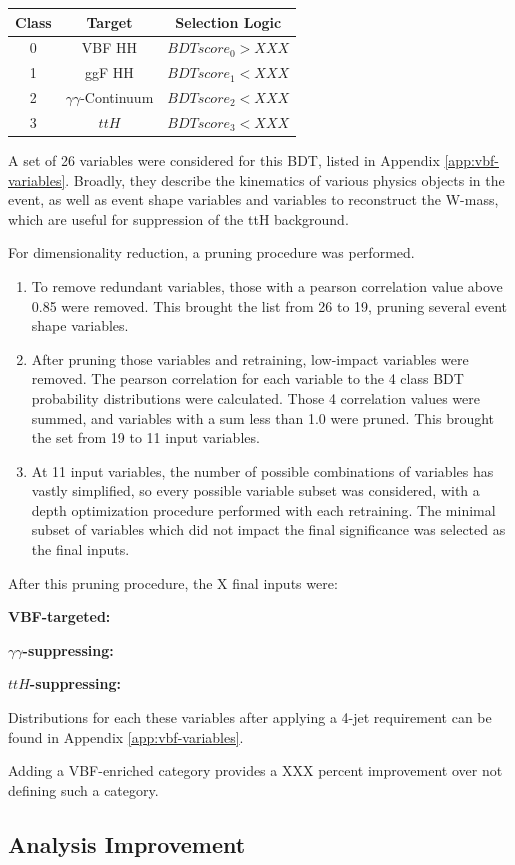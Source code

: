 \begin{center}
	\begin{tabular}{c|c|c}
	\hline
	Class & Target & Selection Logic  \\
	\hline
	0 & VBF HH & $BDTscore_{0} > XXX $ \\
	1 & ggF HH & $BDTscore_{1} < XXX $ \\
	2 & $\gamma\gamma$-Continuum &  $BDTscore_{2} < XXX $ \\
	3 & $ttH$ &  $BDTscore_{3} < XXX $ \\
	\hline
	\end{tabular}
\end{center}


A set of 26 variables were considered for this BDT, listed in Appendix \ref{app:vbf-variables}. Broadly, they describe the kinematics of various physics objects in the event, as well as event shape \cite{STDM-2011-33} variables and variables to reconstruct the W-mass, which are useful for suppression of the ttH background.

For dimensionality reduction, a pruning procedure was performed.
\begin{enumerate}
  \item To remove redundant variables, those with a pearson correlation value above 0.85 were removed. This brought the list from 26 to 19, pruning several event shape variables.
  \item After pruning those variables and retraining, low-impact variables were removed. The pearson correlation for each variable to the 4 class BDT probability distributions were calculated. Those 4 correlation values were summed, and variables with a sum less than 1.0 were pruned. This brought the set from 19 to 11 input variables.
  \item At 11 input variables, the number of possible combinations of variables has vastly simplified, so every possible variable subset was considered, with a depth optimization procedure performed with each retraining. The minimal subset of variables which did not impact the final significance was selected as the final inputs.
\end{enumerate}

After this pruning procedure, the X final inputs were:

\textbf{VBF-targeted:}

\textbf{$\gamma \gamma$-suppressing:}

\textbf{$ttH$-suppressing:}



Distributions for each these variables after applying a 4-jet requirement can be found in Appendix \ref{app:vbf-variables}.

Adding a VBF-enriched category provides a XXX percent improvement over not defining such a category.


\subsection{Analysis Improvement}

